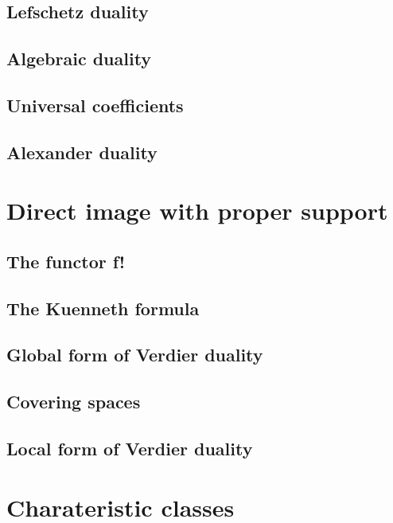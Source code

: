 \documentclass[5pt]{article}
\theoremstyle{definition}
\theoremstyle{remark}
\begin{document}
	\subsection{Lefschetz duality}
	
	\subsection{Algebraic duality}
	
	\subsection{Universal coefficients}
	
	\subsection{Alexander duality}
	
	\newpage
	
	\section{Direct image with proper support}
	
	\subsection{The functor f!}
	
	\subsection{The Kuenneth formula}
	
	\subsection{Global form of Verdier duality}
	
	\subsection{Covering spaces}
	
	\subsection{Local form of Verdier duality}
	
	\newpage
	
	\section{Charateristic classes}
	
\end{document}
